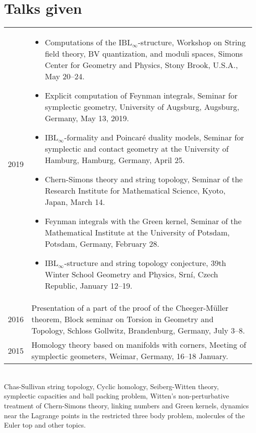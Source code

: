 \documentclass[a4paper,12pt]{article}
\begin{document}
\section*{Talks given}
\def\clap#1{\hbox to 0pt{\hss#1\hss}}
\begingroup
\def\arraystretch{1.5}
\setlength\LTpost{1ex}
\def\minpagewidthTG{.9207\textwidth}
\begin{tabularx}{\textwidth}{@{}lX@{}}
2019 & \begin{minipage}[t]{\minpagewidthTG}
\begin{itemize}[leftmargin=*,itemsep=-1ex]
\item Computations of the $\mathrm{IBL}_\infty$-structure, Workshop on String field theory, BV quantization, and moduli spaces, Simons Center for Geometry and Physics, Stony Brook, U.S.A., May 20--24.
\item  Explicit computation of Feynman integrals, Seminar for symplectic geometry, University of Augsburg, Augsburg, Germany, May 13, 2019.
\item $\mathrm{IBL}_\infty$-formality and Poincar\'e duality models, Seminar for symplectic and contact geometry at the University of Hamburg, Hamburg, Germany, April 25.
\item Chern-Simons theory and string topology, Seminar of the Research Institute for Mathematical Science, Kyoto, Japan, March 14.
\item Feynman integrals with the Green kernel, Seminar of the Mathematical Institute at the University of Potsdam, Potsdam, Germany, February 28.
\item $\mathrm{IBL}_\infty$-structure and string topology conjecture, 39th Winter School Geometry and Physics, Srn\'i, Czech Republic, January 12--19.
\end{itemize}
\end{minipage}\\
2016 & \begin{minipage}[t]{\minpagewidthTG}
Presentation of a part of the proof of the Cheeger-M\"uller theorem, Block seminar on Torsion in Geometry and Topology, Schloss Gollwitz, Brandenburg, Germany, July 3--8.
\end{minipage}\\
2015 & \begin{minipage}[t]{\minpagewidthTG}
Homology theory based on manifolds with corners,  Meeting of symplectic geometers, Weimar, Germany, 16--18 January. 
\end{minipage} \\
\end{tabularx}
\begin{description}[font=\normalfont,leftmargin=2.84em,rightmargin=0em]
\item[Local seminars at the University of Augsburg:]\strut\\
Chas-Sullivan string topology, Cyclic homology, Seiberg-Witten theory, symplectic capacities and ball packing problem, Witten's non-perturbative treatment of Chern-Simons theory, linking numbers and Green kernels, dynamics near the Lagrange points in the restricted three body problem, molecules of the Euler top and other topics.
\end{description}
\endgroup
\clearpage
\end{document}
